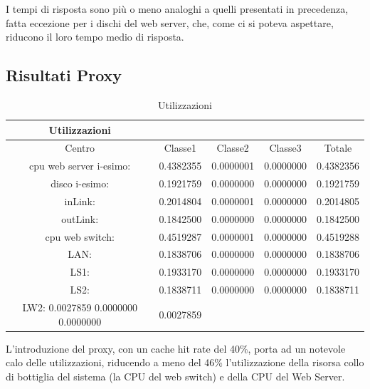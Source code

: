 I tempi di risposta sono più o meno analoghi a quelli presentati in precedenza, fatta eccezione per i dischi del web server, che, come ci si poteva aspettare, riducono il loro tempo medio di risposta.
\subsection{Risultati Proxy}
\begin{table}[htbp]
\begin{center}
\begin{tabular}{|c|c|c|c|c|}
\hline
Utilizzazioni\\
\hline
Centro &Classe1 &Classe2 &Classe3 &Totale\\
\hline
\hline
 cpu web server i-esimo: 	&0.4382355	&0.0000001	&0.0000000	&0.4382356\\
\hline
 disco i-esimo: 	&0.1921759	&0.0000000	&0.0000000	&0.1921759\\
\hline
 inLink: 	&0.2014804	&0.0000001	&0.0000000	&0.2014805\\
\hline
 outLink: 	&0.1842500	&0.0000000	&0.0000000	&0.1842500\\
\hline
 cpu web switch: 	&0.4519287	&0.0000001	&0.0000000	&0.4519288\\
\hline
 LAN: 	&0.1838706	&0.0000000	&0.0000000	&0.1838706\\
\hline
 LS1: 	&0.1933170	&0.0000000	&0.0000000	&0.1933170\\
\hline
 LS2:	&0.1838711	&0.0000000	&0.0000000	&0.1838711\\
\hline
 LW2: 	0.0027859	0.0000000	0.0000000	&0.0027859\\
\hline
\end{tabular}
\end{center}
\caption{Utilizzazioni}
\label{utilizzazioni}
\end{table}
L'introduzione del proxy, con un cache hit rate del 40\%, porta ad un notevole calo delle utilizzazioni, riducendo a meno del 46\% l'utilizzazione della risorsa collo di bottiglia del sistema (la CPU del web switch) e della CPU del Web Server. 
